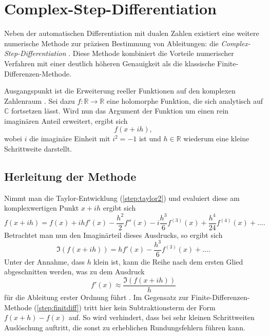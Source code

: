 %
%
%
%

\section{Complex-Step-Differentiation}
\label{step:section:complex}

Neben der automatischen Differentiation mit dualen Zahlen existiert eine weitere numerische Methode zur präzisen Bestimmung von Ableitungen: die \emph{Complex-Step-Differen\-tia\-tion} \cite{step:martins2003}.  
%
Diese Methode kombiniert die Vorteile numerischer Verfahren mit einer deutlich höheren Genauigkeit als die klassische Finite-Differenzen-Methode.

Ausgangspunkt ist die Erweiterung reeller Funktionen auf den komplexen Zahlenraum \cite{step:squire1998,step:martins2003}. Sei dazu $f:\mathbb{R} \to \mathbb{R}$ eine holomorphe Funktion, die sich analytisch auf $\mathbb{C}$ fortsetzen lässt.  
Wird nun das Argument der Funktion um einen rein imaginären Anteil erweitert, ergibt sich
\begin{equation*}
	f(x + i h),
\end{equation*}
wobei $i$ die imaginäre Einheit mit $i^2 = -1$ ist und $h \in \mathbb{R}$ wiederum eine kleine Schrittweite darstellt.

\subsection{Herleitung der Methode}

Nimmt man die Taylor-Entwicklung (\ref{step:taylor2}) und evaluiert diese am komplexwertigen Punkt $x + ih$ ergibt sich
\begin{equation*}
	f(x + i h) = f(x) + i h f'(x) - \frac{h^2}{2} f''(x) - i \frac{h^3}{6} f^{(3)}(x) + \frac{h^4}{24} f^{(4)}(x) + \dots .
\end{equation*}
Betrachtet man nun den Imaginärteil dieses Ausdrucks, so ergibt sich
\begin{equation*}
	\Im(f(x + i h)) = h f'(x) - \frac{h^3}{6} f^{(3)}(x) + \dots .
\end{equation*}
Unter der Annahme, dass $h$ klein ist, kann die Reihe nach dem ersten Glied abgeschnitten werden, was zu dem Ausdruck
\begin{equation}
	f'(x) \approx \frac{\Im(f(x + i h))}{h}
	\label{step:complexstep}
\end{equation}
für die Ableitung erster Ordnung führt \cite{step:squire1998}.
Im Gegensatz zur Finite-Differenzen-Methode (\ref{step:finitdiff}) tritt hier kein Subtraktionsterm der Form $f(x+h) - f(x)$ auf.  %
So wird verhindert, dass bei sehr kleinen Schrittweiten Auslöschung auftritt, die sonst zu erheblichen Rundungsfehlern führen kann.

